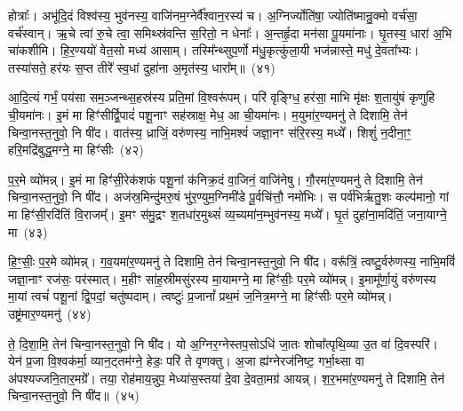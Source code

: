 होत्राः᳚। अभू॑दि॒दं विश्व॑स्य॒ भुव॑नस्य॒ वाजि॑नम॒ग्नेर्वै᳚श्वान॒रस्य॑ च। अ॒ग्निर्ज्योति॑षा॒ ज्योति॑ष्मान्रु॒क्मो वर्च॑सा॒ वर्च॑स्वान्। ऋ॒चे त्वा॑ रु॒चे त्वा॒ समिथ्स्र॑वन्ति स॒रितो॒ न धेनाः᳚। अ॒न्तर्\mbox{}हृ॒दा मन॑सा पू॒यमा॑नाः। घृ॒तस्य॒ धारा॑ अ॒भि चा॑कशीमि। हि॒र॒ण्ययो॑ वेत॒सो मध्य॑ आसाम्। तस्मि᳚न्थ्सुप॒र्णो म॑धु॒कृत्कु॑ला॒यी भज॑न्नास्ते॒ मधु॑ दे॒वता᳚भ्यः। तस्या॑सते॒ हर॑यः स॒प्त तीरे᳚ स्व॒धां दुहा॑ना अ॒मृत॑स्य॒ धारा᳚म्॥~(४१)

{\anuvakamend[{प्र॒ति॒ष्ठायै॑ स॒हस्र॑वीर्या पर॒मं वि॒राट्थ्स॒प्त तीरे॑ च॒त्वारि॑ च}]}%

आ॒दि॒त्यं गर्भं॒ पय॑सा सम॒ञ्जन्थ्स॒हस्र॑स्य प्रति॒मां वि॒श्वरू॑पम्। परि॑ वृङ्ग्धि॒ हर॑सा॒ माभि मृ॑क्षः श॒तायु॑षं कृणुहि ची॒यमा॑नः। इ॒मं मा हिꣳ॑सीर्द्वि॒पादं॑ पशू॒नाꣳ सह॑स्राक्ष॒ मेध॒ आ ची॒यमा॑नः। म॒युमा॑र॒ण्यमनु॑ ते दिशामि॒ तेन॑ चिन्वा॒नस्त॒नुवो॒ नि षी॑द। वात॑स्य॒ ध्राजिं॒ वरु॑णस्य॒ नाभि॒मश्वं॑ जज्ञा॒नꣳ स॑रि॒रस्य॒ मध्ये᳚। शिशुं॑ न॒दीना॒ꣳ॒ हरि॒मद्रि॑बुद्ध॒मग्ने॒ मा हिꣳ॑सीः~(४२)

प॒र॒मे व्यो॑मन्न्। इ॒मं मा हिꣳ॑सी॒रेक॑शफं पशू॒नां क॑निक्र॒दं वा॒जिनं॒ वाजि॑नेषु। गौ॒रमा॑र॒ण्यमनु॑ ते दिशामि॒ तेन॑ चिन्वा॒नस्त॒नुवो॒ नि षी॑द। अज॑स्र॒मिन्दु॑मरु॒षं भु॑र॒ण्युम॒ग्निमी॑डे पू॒र्वचि॑त्तौ॒ नमो॑भिः। स पर्व॑भिर्\mbox{}ऋतु॒शः कल्प॑मानो॒ गां मा हिꣳ॑सी॒रदि॑तिं वि॒राजम्᳚। इ॒मꣳ स॑मु॒द्रꣳ श॒तधा॑र॒मुथ्सं॑ व्य॒च्यमा॑न॒म्भुव॑नस्य॒ मध्ये᳚। घृ॒तं दुहा॑ना॒मदि॑तिं॒ जना॒याग्ने॒ मा~(४३)

हि॒ꣳ॒सीः॒ प॒र॒मे व्यो॑मन्न्। ग॒व॒यमा॑र॒ण्यमनु॑ ते दिशामि॒ तेन॑ चिन्वा॒नस्त॒नुवो॒ नि षी॑द। वरू᳚त्रिं॒ त्वष्टु॒र्वरु॑णस्य॒ नाभि॒मविं॑ जज्ञा॒नाꣳ रज॑सः॒ पर॑स्मात्। म॒हीꣳ सा॑ह॒स्रीमसु॑रस्य मा॒यामग्ने॒ मा हिꣳ॑सीः॒ पर॒मे व्यो॑मन्न्। इ॒मामू᳚र्णा॒युं वरु॑णस्य मा॒यां त्वचं॑ पशू॒नां द्वि॒पदां॒ चतु॑ष्पदाम्। त्वष्टुः॑ प्र॒जानां᳚ प्रथ॒मं ज॒नित्र॒मग्ने॒ मा हिꣳ॑सीः पर॒मे व्यो॑मन्न्। उष्ट्र॑मार॒ण्यमनु॑~(४४)

ते॒ दि॒शा॒मि॒ तेन॑ चिन्वा॒नस्त॒नुवो॒ नि षी॑द। यो अ॒ग्निर॒ग्नेस्तप॒सो\-ऽधि॑ जा॒तः शोचा᳚त्पृथि॒व्या उ॒त वा॑ दि॒वस्परि॑। येन॑ प्र॒जा वि॒श्वक॑र्मा॒ व्यान॒ट्तम॑ग्ने॒ हेडः॒ परि॑ ते वृणक्तु। अ॒जा ह्य॑ग्नेरज॑निष्ट॒ गर्भा॒थ्सा वा अ॑पश्यज्जनि॒तार॒मग्रे᳚। तया॒ रोह॑माय॒न्नुप॒ मेध्या॑स॒स्तया॑ दे॒वा दे॒वता॒मग्र॑ आयन्न्। श॒र॒भमा॑र॒ण्यमनु॑ ते दिशामि॒ तेन॑ चिन्वा॒नस्त॒नुवो॒ नि षी॑द॥~(४५)

{\anuvakamend[{अग्ने॒ मा हिꣳ॑सी॒रग्ने॒ मोष्ट्र॑मार॒ण्यमनु॑ शर॒भं नव॑ च}]}%

